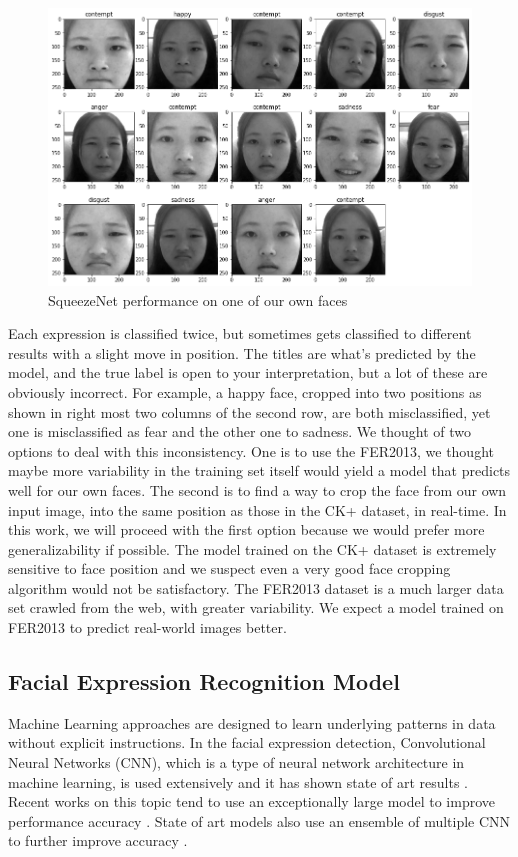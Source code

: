 \documentclass{article}
\begin{document}
\begin{figure}[]
    \centering
    \includegraphics[width=\textwidth]{figs/ourfacesqueeze.png}
    \caption{SqueezeNet performance on one of our own faces}
    \label{fig:our own face rec}
\end{figure}

Each expression is classified twice, but sometimes gets classified to different results with a slight move in position. The titles are what’s predicted by the model, and the true label is open to your interpretation, but a lot of these are obviously incorrect. For example, a happy face, cropped into two positions as shown in right most two columns of the second row, are both misclassified, yet one is misclassified as fear and the other one to sadness. We thought of two options to deal with this inconsistency. One is to use the FER2013, we thought maybe more variability in the training set itself would yield a model that predicts well for our own faces. The second is to find a way to crop the face from our own input image, into the same position as those in the CK+ dataset, in real-time. In this work, we will proceed with the first option because we would prefer more generalizability if possible. The model trained on the CK+ dataset is extremely sensitive to face position and we suspect even a very good face cropping algorithm would not be satisfactory. The FER2013 dataset is a much larger data set crawled from the web, with greater variability. We expect a model trained on FER2013 to predict real-world images better. 

\subsection{Facial Expression Recognition Model}
Machine Learning approaches are designed to learn underlying patterns in data without explicit instructions. In the facial expression detection, Convolutional Neural Networks (CNN), which is a type of neural network architecture in machine learning, is used extensively and it has shown state of art results \cite{khan_2020}. Recent works on this topic tend to use an exceptionally large model to improve performance accuracy \cite{Pramerdorfer2016}. State of art models also use an ensemble of multiple CNN to further improve accuracy \cite{goodfellow_2013}.
\end{document}
